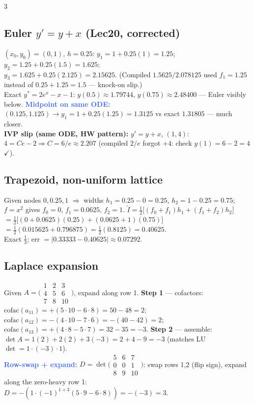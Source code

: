 \documentclass[9pt]{extarticle}
\newcommand{\hl}[1]{\textbf{\textcolor{BrickRed}{#1}}}
\newcommand{\wk}[1]{\textbf{\textcolor{OliveGreen}{#1}}}
\newcommand{\ex}[1]{\textbf{\textcolor{RoyalBlue}{#1}}}
\begin{document}
\begin{multicols}{3}
\begin{sloppypar}
\subsection{Euler $y'=y+x$ (Lec20, corrected)}
$(x_0,y_0)=(0,1)$, $h=0.25$: $y_1=1+0.25(1)=1.25$; $y_2=1.25+0.25(1.5)=1.625$;\\
$y_3=1.625+0.25(2.125)=2.15625$. (Compiled $1.5625/2.078125$ used $f_1=1.25$ instead of $0.25+1.25=1.5$ — knock-on slip.)\\
Exact $y^*=2e^x-x-1$: $y(0.5)\approx1.79744$, $y(0.75)\approx2.48400$ — Euler visibly below.
\ex{Midpoint on same ODE:} $(0.125,1.125)\to y_1=1+0.25(1.25)=1.3125$ vs exact $1.31805$ — much closer.\\
\hl{IVP slip (same ODE, HW pattern):} $y'=y+x$, $(1,4)$: $4=Ce-2\Rightarrow C=6/e\approx2.207$ (compiled $2/e$ forgot $+4$: check $y(1)=6-2=4$ $\checkmark$).

\subsection{Trapezoid, non-uniform lattice}
Given nodes $0,0.25,1$ $\Rightarrow$ widths $h_1=0.25-0=0.25$, $h_2=1-0.25=0.75$; $f=x^2$ gives $f_0=0$, $f_1=0.0625$, $f_2=1$.
$\tilde I=\tfrac12\big[(f_0{+}f_1)h_1+(f_1{+}f_2)h_2\big]$\\
$=\tfrac12\big[(0{+}0.0625)(0.25)+(0.0625{+}1)(0.75)\big]$\\
$=\tfrac12(0.015625+0.796875)=\tfrac12(0.8125)=0.40625$.\\
Exact $\tfrac13$; err $=|0.33333-0.40625|\approx0.07292$.

\subsection{Laplace expansion}
Given $A=\big(\begin{smallmatrix}1&2&3\\4&5&6\\7&8&10\end{smallmatrix}\big)$, expand along row 1.
\wk{Step 1} — cofactors: $\mathrm{cofac}(a_{11})=+(5\cdot10-6\cdot8)=50-48=2$; $\mathrm{cofac}(a_{12})=-(4\cdot10-7\cdot6)=-(40-42)=2$; $\mathrm{cofac}(a_{13})=+(4\cdot8-5\cdot7)=32-35=-3$.
\wk{Step 2} — assemble: $\det A=1(2)+2(2)+3(-3)=2+4-9=-3$ (matches LU $\det=1\cdot(-3)\cdot1$).\\
\ex{Row-swap + expand:} $D=\det\big(\begin{smallmatrix}5&6&7\\0&0&1\\8&9&10\end{smallmatrix}\big)$: swap rows 1,2 (flip sign), expand along the zero-heavy row 1:\\
$D=-(1\cdot(-1)^{1+3}(5\cdot9-6\cdot8))=-(-3)=3$.
\end{sloppypar}

\end{multicols}
\end{document}
